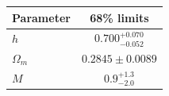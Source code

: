 \begin{tabular} { l  c}

 Parameter &  68\% limits\\
\hline
{\boldmath$h              $} & $0.700^{+0.070}_{-0.052}   $\\

{\boldmath$Ω_m            $} & $0.2845\pm 0.0089          $\\

{\boldmath$M              $} & $0.9^{+1.3}_{-2.0}         $\\
\hline
\end{tabular}